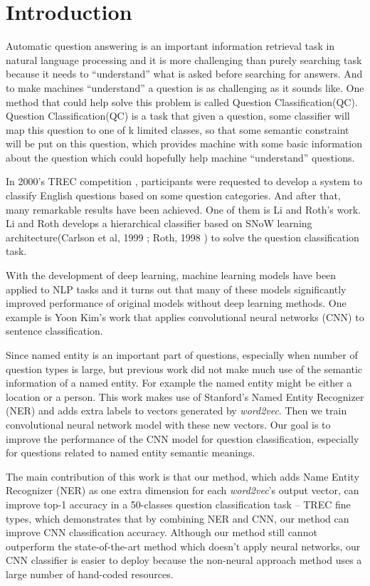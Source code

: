 \documentclass[10pt,twocolumn,letterpaper]{article}
\begin{document}
\section{Introduction}
Automatic question answering is an important information retrieval task in natural language processing and it is more challenging than purely searching task because it needs to ``understand'' what is asked before searching for answers. And to make machines ``understand'' a question is as challenging as it sounds like. One method that could help solve this problem is called Question Classification(QC). Question Classification(QC) is a task that given a question, some classifier will map this question to one of k limited classes, so that some semantic constraint will be put on this question, which provides machine with some basic information about the question which could hopefully help machine ``understand'' questions.

In 2000's TREC competition \cite{li2002learning}, participants were requested to develop a system to classify English questions based on some question categories. And after that, many remarkable results have been achieved. One of them is Li and Roth's work. Li and Roth develops a hierarchical classifier based on SNoW learning architecture(Carlson et al, 1999 \cite{carlson1999snow}; Roth, 1998 \cite{roth1998learning}) to solve the question classification task.

With the development of deep learning, machine learning models have been applied to NLP tasks and it turns out that many of these models significantly improved performance of original models without deep learning methods. One example is Yoon Kim's \cite{kim2014convolutional} work that applies convolutional neural networks (CNN) to sentence classification.

Since named entity is an important part of questions, especially when number of question types is large, but previous work did not make much use of the semantic information of a named entity. For example the named entity might be either a location or a person. This work makes use of Stanford's Named Entity Recognizer (NER) \cite{nadeau2007survey} and adds extra labels to vectors generated by \textit{word2vec}. Then we train convolutional neural network model with these new vectors. Our goal is to improve the performance of the CNN model for question classification, especially for questions related to named entity semantic meanings.

The main contribution of this work is that our method, which adds Name Entity Recognizer (NER) as one extra dimension for each \textit{word2vec}'s output vector, can improve top-1 accuracy in a 50-classes question classification task -- TREC fine types, which demonstrates that by combining NER and CNN, our method can improve CNN classification accuracy. Although our method still cannot outperform the state-of-the-art method which doesn't apply neural networks, our CNN classifier is easier to deploy because the non-neural approach method uses a large number of hand-coded resources. 
\end{document}
